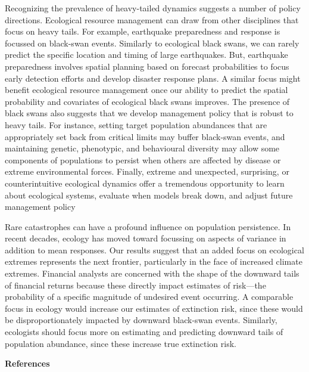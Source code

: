 Recognizing the prevalence of heavy-tailed dynamics suggests a number of policy directions. Ecological resource management can draw from other disciplines that focus on heavy tails. For example, earthquake preparedness and response is focussed on black-swan events. Similarly to ecological black swans, we can rarely predict the specific location and timing of large earthquakes. But, earthquake preparedness involves spatial planning based on forecast probabilities to focus early detection efforts and develop disaster response plans\cite{nrc2007}. A similar focus might benefit ecological resource management once our ability to predict the spatial probability and covariates of ecological black swans improves. The presence of black swans also suggests that we develop management policy that is robust to heavy tails. For instance, setting target population abundances that are appropriately set back from critical limits may buffer black-swan events\cite{caddy1996}, and maintaining genetic, phenotypic, and behavioural diversity may allow some components of populations to persist when others are affected by disease or extreme environmental forces\cite{hilborn2003, schindler2010, anderson2015}. Finally, extreme and unexpected, surprising, or counterintuitive ecological dynamics offer a tremendous opportunity to learn about ecological systems, evaluate when models break down, and adjust future management policy\cite{doak2008, pine-iii2009, lindenmayer2010}

Rare catastrophes can have a profound influence on population persistence\cite{mangel1994}. In recent decades, ecology has moved toward focussing on aspects of variance in addition to mean responses\cite{loreau2010a, thompson2013}. Our results suggest that an added focus on ecological extremes represents the next frontier, particularly in the face of increased climate extremes\cite{meehl2004, ipcc2012, thompson2013}. Financial analysts are concerned with the shape of the downward tails of financial returns because these directly impact estimates of risk---the probability of a specific magnitude of undesired event occurring\cite{rachev2008}. A comparable focus in ecology would increase our estimates of extinction risk, since these would be disproportionately impacted by downward black-swan events. Similarly, ecologists should focus more on estimating and predicting downward tails of population abundance, since these increase true extinction risk.

\textbf{References}

\renewcommand{\section}[2]{}%

